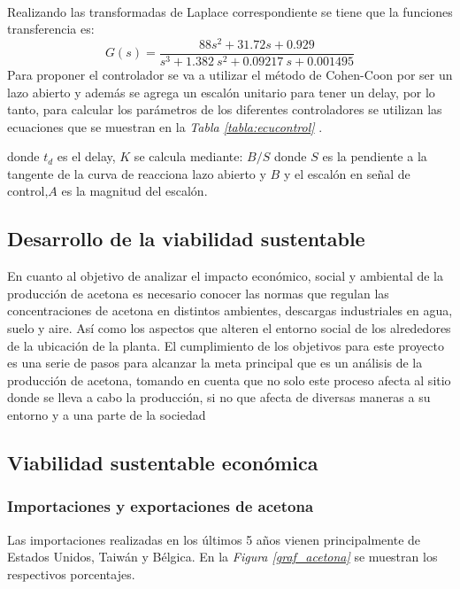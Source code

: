     \paragraph{}
    Realizando las transformadas de Laplace correspondiente se tiene que la funciones transferencia es:\\

        \begin{equation*}
            G(s) = \dfrac{88 s^2 + 31.72 s + 0.929}{s^{3} + 1.382\:s^2 + 0.09217\:s + 0.001495 }
        \end{equation*}
    Para proponer el controlador se va a utilizar el método de Cohen-Coon por ser un lazo abierto y además se agrega un escalón unitario para tener un delay, por lo tanto, para calcular los parámetros de los diferentes  controladores se utilizan las ecuaciones que se muestran en la \textit{Tabla \ref{tabla:ecucontrol}} . 


    


    donde $t_d$ es el delay,
    $K$ se calcula mediante: $B/S $ 
    donde $S$ es la pendiente a la tangente de la curva de reacciona lazo abierto y $B$ y el escalón en señal de control,$A$  es la magnitud del escalón. 

    \subsection*{Desarrollo de la viabilidad sustentable}
    En cuanto al objetivo de analizar el impacto económico, social y ambiental de la producción de acetona es necesario conocer las normas que regulan las concentraciones de acetona en distintos ambientes, descargas industriales en agua, suelo y aire. Así como los aspectos que alteren el entorno  social de los alrededores de la ubicación de la planta.
    El cumplimiento de los objetivos  para este proyecto es una serie de pasos para alcanzar la meta principal que es un análisis  de la producción de  acetona, tomando en cuenta que no solo este proceso afecta al sitio  donde se lleva a cabo la producción, si no que afecta  de diversas maneras a su entorno y a una parte de la sociedad

    \subsection*{Viabilidad sustentable económica}
    \subsubsection*{Importaciones y exportaciones de acetona}
    Las importaciones realizadas en los últimos 5 años vienen principalmente de Estados Unidos, Taiwán y Bélgica. En la \textit{Figura \ref{graf_acetona}} se muestran los respectivos porcentajes.

